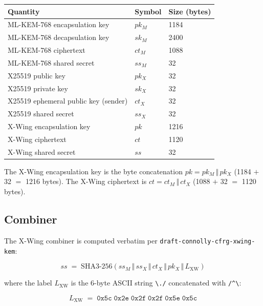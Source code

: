 \documentclass[11pt,a4paper]{article}
\begin{document}
\begin{table}[H]
\centering
\begin{tabularx}{\textwidth}{lll}
\toprule
\textbf{Quantity} & \textbf{Symbol} & \textbf{Size (bytes)} \\
\midrule
ML-KEM-768 encapsulation key   & $pk_M$ & 1184 \\
ML-KEM-768 decapsulation key   & $sk_M$ & 2400 \\
ML-KEM-768 ciphertext          & $ct_M$ & 1088 \\
ML-KEM-768 shared secret       & $ss_M$ & 32 \\
X25519 public key              & $pk_X$ & 32 \\
X25519 private key             & $sk_X$ & 32 \\
X25519 ephemeral public key (sender) & $ct_X$ & 32 \\
X25519 shared secret           & $ss_X$ & 32 \\
\midrule
X-Wing encapsulation key       & $pk$   & 1216 \\
X-Wing ciphertext              & $ct$   & 1120 \\
X-Wing shared secret           & $ss$   & 32 \\
\bottomrule
\end{tabularx}
\end{table}

The X-Wing encapsulation key is the byte concatenation $pk = pk_M \,\Vert\, pk_X$
(1184 $+$ 32 $=$ 1216 bytes). The X-Wing ciphertext is
$ct = ct_M \,\Vert\, ct_X$ (1088 $+$ 32 $=$ 1120 bytes).

\subsection{Combiner}

The X-Wing combiner is computed verbatim per
\texttt{draft-connolly-cfrg-xwing-kem}:

\begin{equation}
ss \;=\; \mathrm{SHA3\text{-}256}\!\left( ss_M \,\Vert\, ss_X \,\Vert\, ct_X \,\Vert\, pk_X \,\Vert\, L_{\mathrm{XW}} \right)
\label{eq:combiner}
\end{equation}

where the label $L_{\mathrm{XW}}$ is the 6-byte ASCII string
\texttt{\textbackslash./} concatenated with \texttt{/\textasciicircum\textbackslash}:

\begin{equation}
L_{\mathrm{XW}} \;=\; \texttt{0x5c}\;\texttt{0x2e}\;\texttt{0x2f}\;\texttt{0x2f}\;\texttt{0x5e}\;\texttt{0x5c}
\end{equation}
\end{document}
